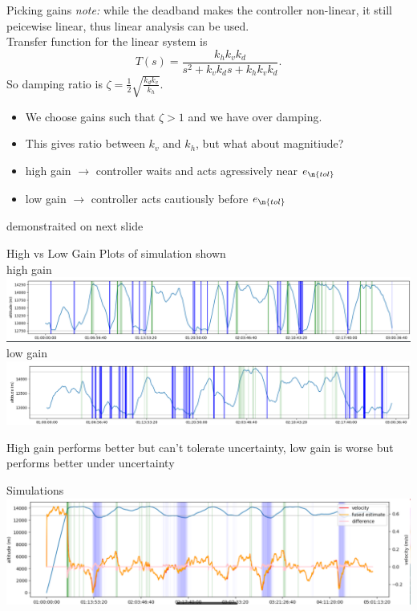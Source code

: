 \documentclass[10pt,mathserif]{beamer}
\begin{document}


\begin{frame}{Picking gains}
\emph{note:} while the deadband makes the controller non-linear, it still peicewise linear, thus linear analysis can be used.\\
Transfer function for the linear system is\\
\[T(s) = \frac{k_h k_v k_d}{s^2 + k_v k_d s + k_h k_v k_d}.\]
So damping ratio is $\zeta = \frac{1}{2}\sqrt{\frac{k_d k_v}{k_h}}$. 
\begin{itemize}
\item We choose gains such that $\zeta > 1$ and we have over damping.
\item This gives ratio between $k_v$ and $k_h$, but what about magnitiude?
\item high gain $\to$ controller waits and acts agressively near $e_{\n{tol}}$
\item low gain $\to$ controller acts cautiously before $e_{\n{tol}}$
\end{itemize}
demonstraited on next slide
\end{frame}

\begin{frame}{High vs Low Gain}
Plots of simulation shown\\
high gain
\includegraphics[width=\linewidth,trim={0 5 0 0cm},clip]{highgainsim.png}
\vspace{.05cm}\\
low gain
\includegraphics[width=\linewidth,trim={0 0 0 0cm},clip]{lowgainsim.png}

High gain performs better but can't tolerate uncertainty, low gain is worse but performs better under uncertainty
\end{frame}

\begin{frame}{Simulations}
\includegraphics[width=1\linewidth]{lsim.png}
\end{frame}
\end{document}
